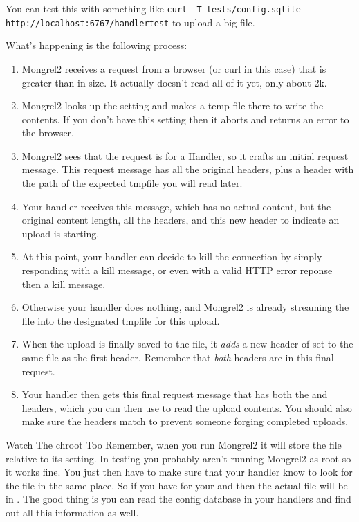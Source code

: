 You can test this with something like
\verb|curl -T tests/config.sqlite http://localhost:6767/handlertest| to upload a big file.

What's happening is the following process:

\begin{enumerate}
\item Mongrel2 receives a request from a browser (or curl in this case) that is greater than  in size.  It actually doesn't read all of it yet, only about 2k.
\item Mongrel2 looks up the  setting and makes a temp file there to write the contents.  If you don't have this setting then it aborts and returns an error to the browser.
\item Mongrel2 sees that the request is for a Handler, so it crafts an initial request message.  This request message has all the original headers, plus a  header with the path of the expected tmpfile you will read later.
\item Your handler receives this message, which has no actual content, but the original content length, all the headers, and this new header to indicate an upload is starting.
\item At this point, your handler can decide to kill the connection by simply responding with a kill message, or even with a valid HTTP error reponse then a kill message.
\item Otherwise your handler does nothing, and Mongrel2 is already streaming the file into the designated tmpfile for this upload.
\item When the upload is finally saved to the file, it \emph{adds} a new header of  set to the same file as the first header.  Remember that \emph{both} headers are in this final request.
\item Your handler then gets this final request message that has both the  and  headers, which you can then use to read the upload contents.  You should also make sure the headers match to prevent someone forging completed uploads.
\end{enumerate}

\begin{aside}{Watch The chroot Too}
Remember, when you run Mongrel2 it will store the file relative to its  setting.  In testing you probably aren't
running Mongrel2 as root so it works fine.  You just then have to make sure that your handler know to look for the file in the
same place.  So if you have  for your  and  then the
actual file will be in .  The good thing is you can read the config database
in your handlers and find out all this information as well.
\end{aside}

